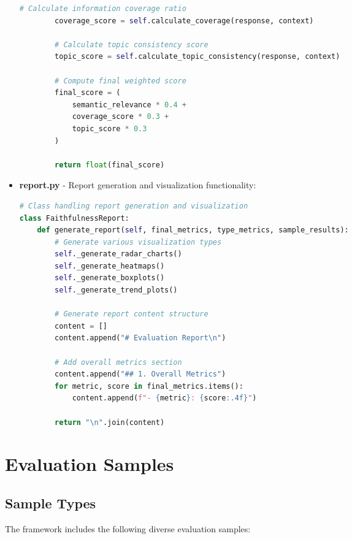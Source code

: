 \begin{itemize}
\begin{lstlisting}[language=Python, breaklines=true, basicstyle=\ttfamily\scriptsize, commentstyle=\color{gray}]
        # Calculate information coverage ratio
        coverage_score = self.calculate_coverage(response, context)
        
        # Calculate topic consistency score
        topic_score = self.calculate_topic_consistency(response, context)
        
        # Compute final weighted score
        final_score = (
            semantic_relevance * 0.4 +
            coverage_score * 0.3 +
            topic_score * 0.3
        )
        
        return float(final_score)
    \end{lstlisting}

    \item \textbf{report.py} - Report generation and visualization functionality:
    \begin{lstlisting}[language=Python, breaklines=true, basicstyle=\ttfamily\scriptsize, commentstyle=\color{gray}]
# Class handling report generation and visualization
class FaithfulnessReport:
    def generate_report(self, final_metrics, type_metrics, sample_results):
        # Generate various visualization types
        self._generate_radar_charts()
        self._generate_heatmaps()
        self._generate_boxplots()
        self._generate_trend_plots()
        
        # Generate report content structure
        content = []
        content.append("# Evaluation Report\n")
        
        # Add overall metrics section
        content.append("## 1. Overall Metrics")
        for metric, score in final_metrics.items():
            content.append(f"- {metric}: {score:.4f}")
        
        return "\n".join(content)
    \end{lstlisting}
\end{itemize}

\section{Evaluation Samples}

\subsection{Sample Types}
The framework includes the following diverse evaluation samples:

